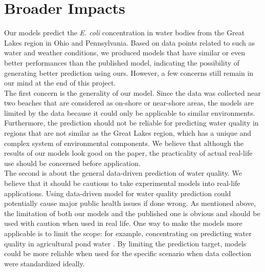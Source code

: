 
\section{Broader Impacts}
\label{sec:impacts}

Our models predict the \textit{E. coli} concentration in water bodies from the Great Lakes region in Ohio and Pennsylvania. Based on data points related to such as water and weather conditions, we produced models that have similar or even better performances than the published model, indicating the possibility of generating better prediction using ours. However, a few concerns still remain in our mind at the end of this project.\\
The first concern is the generality of our model. Since the data was collected near two beaches that are considered as on-shore or near-shore areas, the models are limited by the data because it could only be applicable to similar environments. Furthermore, the prediction should not be reliable for predicting water quality in regions that are not similar as the Great Lakes region, which has a unique and complex system of environmental components. We believe that although the results of our models look good on the paper, the practicality of actual real-life use should be concerned before application.\\
The second is about the general data-driven prediction of water quality. We believe that it should be cautious to take experimental models into real-life applications. Using data-driven model for water quality prediction could potentially cause major public health issues if done wrong. As mentioned above, the limitation of both our models and the published one is obvious and should be used with caution when used in real life. One way to make the models more applicable is to limit the scope: for example, concentrating on predicting water quality in agricultural pond water \cite{Stocker}. By limiting the prediction target, models could be more reliable when used for the specific scenario when data collection were standardized ideally. 